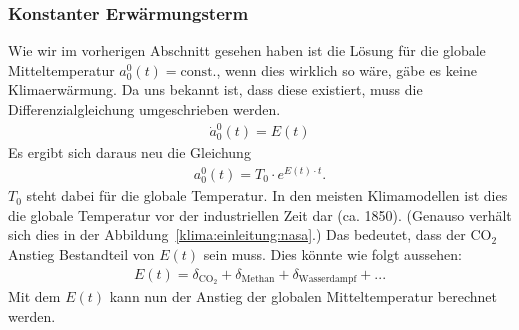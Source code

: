 \begin{refsection}
\subsubsection{Konstanter Erwärmungsterm
\label{klima:subsubsection:erwaermungsterm}}
Wie wir im vorherigen Abschnitt gesehen haben ist die Lösung für die globale Mitteltemperatur $a^0_0(t)=\text{const.}$, wenn dies wirklich so wäre, gäbe es keine Klimaerwärmung. Da uns bekannt ist, dass diese existiert, muss die Differenzialgleichung umgeschrieben werden.
\begin{align}
\dot a^0_0(t)=E(t)
\end{align}
Es ergibt sich daraus neu die Gleichung
\begin{align}
a^0_0(t)=T_0 \cdot e^{E(t)\cdot t}.
\end{align}
$T_0$ steht dabei für die globale Temperatur. In den meisten Klimamodellen ist dies die globale Temperatur vor der industriellen Zeit dar (ca. 1850). (Genauso verhält sich dies in der Abbildung~\ref{klima:einleitung:nasa}.) Das bedeutet, dass der CO$_2$ Anstieg Bestandteil von $E(t)$ sein muss. Dies könnte wie folgt aussehen:
\begin{align}
E(t)=\delta_{\text{CO}_2}+\delta_{\text{Methan}}+\delta_{\text{Wasserdampf}}+...
\end{align}
Mit dem $E(t)$ kann nun der Anstieg der globalen Mitteltemperatur berechnet werden.


\end{refsection}
